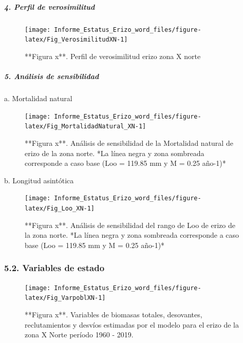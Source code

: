 \documentclass[
]{article}
\begin{document}
\hypertarget{perfil-de-verosimilitud-1}{%
\subparagraph{\texorpdfstring{\textbf{\emph{4. Perfil de
verosimilitud}}}{4. Perfil de verosimilitud}}\label{perfil-de-verosimilitud-1}}

\begin{figure}

{\centering \texttt{[image: Informe\_Estatus\_Erizo\_word\_files/figure-latex/Fig\_VerosimilitudXN-1]} 

}

\caption{**Figura x**.  Perfil de verosimilitud erizo zona X norte}\label{fig:Fig_VerosimilitudXN}
\end{figure}

\hypertarget{anuxe1lisis-de-sensibilidad-1}{%
\subparagraph{\texorpdfstring{\textbf{\emph{5. Análisis de
sensibilidad}}}{5. Análisis de sensibilidad}}\label{anuxe1lisis-de-sensibilidad-1}}

a. Mortalidad natural

\begin{figure}

{\centering \texttt{[image: Informe\_Estatus\_Erizo\_word\_files/figure-latex/Fig\_MortalidadNatural\_XN-1]} 

}

\caption{**Figura x**.  Análisis de sensibilidad de la Mortalidad natural de erizo de la zona norte. *La línea negra y zona sombreada corresponde a caso base (Loo = 119.85 mm y M = 0.25 año-1)*}\label{fig:Fig_MortalidadNatural_XN}
\end{figure}

b. Longitud asintótica

\begin{figure}

{\centering \texttt{[image: Informe\_Estatus\_Erizo\_word\_files/figure-latex/Fig\_Loo\_XN-1]} 

}

\caption{**Figura x**.  Análisis de sensibilidad del rango de Loo de erizo de la zona norte. *La línea negra y zona sombreada corresponde a caso base (Loo = 119.85 mm y M = 0.25 año-1)*}\label{fig:Fig_Loo_XN}
\end{figure}

\hypertarget{variables-de-estado}{%
\subsubsection{5.2. Variables de estado}\label{variables-de-estado}}

\begin{figure}

{\centering \texttt{[image: Informe\_Estatus\_Erizo\_word\_files/figure-latex/Fig\_VarpoblXN-1]} 

}

\caption{**Figura x**. Variables de biomasas totales, desovantes, reclutamientos y desvíos estimadas por el modelo para el erizo de la zona X Norte período 1960 - 2019.}\label{fig:Fig_VarpoblXN}
\end{figure}
\end{document}
